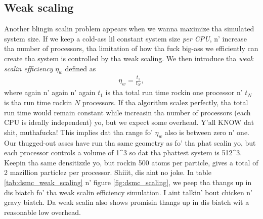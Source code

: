 \subsection{Weak scaling}
Another blingin scalin problem appears when we wanna maximize tha simulated system size. If we keep a cold-ass lil constant system size \textit{per CPU}, n' increase tha number of processors, tha limitation of how tha fuck big-ass we efficiently can create tha system is controlled by tha weak scaling. We then introduce tha \textit{weak scalin efficiency} $\eta_w$ defined as
\begin{align}
    \eta_w = \frac{t_1}{t_N},
\end{align}
where again n' again n' again $t_1$ is tha total run time rockin one processor n' $t_N$ is tha run time rockin $N$ processors. If tha algorithm scalez perfectly, tha total run time would remain constant while increasin tha number of processors (each CPU is ideally independent) yo, but we expect some overhead. Y'all KNOW dat shit, muthafucka! This implies dat tha range fo' $\eta_w$ also is between zero n' one. Our thugged-out asses have run tha same geometry as fo' tha phat scalin yo, but each processor controls a volume of \unit{1}{\micro\meter^3} so dat tha phattest system is \unit{512}{\micro\meter^3}. Keepin tha same densitizzle yo, but rockin 500 atoms per particle, gives a total of 2 mazillion particlez per processor. Shiiit, dis aint no joke. In table \ref{tab:dsmc_weak_scaling} n' figure \ref{fig:dsmc_scaling}, we peep tha thangs up in dis biatch fo' tha weak scalin efficiency simulation. I aint talkin' bout chicken n' gravy biatch. Da weak scalin also shows promisin thangs up in dis biatch wit a reasonable low overhead.
